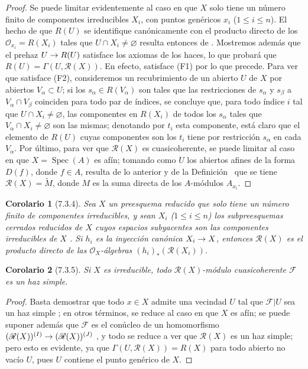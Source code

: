 \documentclass[oneside]{amsart}
\theoremstyle{ega-env-style}
\theoremstyle{ega-thm-env-style}
\newtheorem*{corollary}{Corolario}
\theoremstyle{ega-defn-env-style}
\def\leq{\leqslant}                 %
\renewcommand{\to}{\mathchoice{\longrightarrow}{\rightarrow}{\rightarrow}{\rightarrow}}
\let\EGAOriginalLabel\label
\renewcommand{\label}[1]{\phantomsection\EGAOriginalLabel{#1}}
\begin{document}
\begin{proof}
Se puede limitar evidentemente al caso en que $X$ solo tiene un número finito de componentes irreducibles $X_i$, con puntos genéricos $x_i$ ($1\leq i\leq n$).
El hecho de que $R(U)$ se identifique canónicamente con el producto directo de los $\mathscr{O}_{x_i}=R(X_i)$ tales que $U\cap X_i\neq\varnothing$ resulta entonces de .
Mostremos además que el prehaz $U\to R(U)$ satisface los axiomas de los haces, lo que probará que $R(U)=\Gamma(U,\mathscr{R}(X))$.
En efecto, satisface (F1) por lo que precede.
Para ver que satisface (F2), consideremos un recubrimiento de un abierto $U$ de $X$ por abiertos $V_\alpha\subset U$; si los $s_\alpha\in R(V_\alpha)$ son tales que las restricciones de $s_\alpha$ y $s_\beta$ a $V_\alpha\cap V_\beta$ coinciden para todo par de índices, se concluye que, para todo índice $i$ tal que $U\cap X_i\neq\varnothing$, las componentes en $R(X_i)$ de todos los $s_\alpha$ tales que $V_\alpha\cap X_i\neq\varnothing$ son las mismas; denotando por $t_i$ esta componente, está claro que el elemento de $R(U)$ cuyas componentes son los $t_i$ tiene por restricción $s_\alpha$ en cada $V_\alpha$.
Por último, para ver que $\mathscr{R}(X)$ es cuasicoherente, se puede limitar al caso en que $X=\operatorname{Spec}(A)$ es afín; tomando como $U$ los abiertos afines de la forma $D(f)$, donde $f\in A$, resulta de lo anterior y de la Definición~ que se tiene $\mathscr{R}(X)=\widetilde M$, donde $M$ es la suma directa de los $A$-módulos $A_{x_i}$.
\end{proof}

\begin{corollary}[7.3.4]
\label{I.7.3.4}
Sea $X$ un preesquema reducido que solo tiene un número finito de componentes irreducibles, y sean $X_i$ ($1\leq i\leq n$) los subpreesquemas cerrados reducidos de $X$ cuyos espacios subyacentes son las componentes irreducibles de $X$ .
Si $h_i$ es la inyección canónica $X_i\to X$, entonces $\mathscr{R}(X)$ es el producto directo de las $\mathscr{O}_X$-álgebras $(h_i)_*(\mathscr{R}(X_i))$.
\end{corollary}

\begin{corollary}[7.3.5]
\label{I.7.3.5}
Si $X$ es irreducible, todo $\mathscr{R}(X)$-módulo cuasicoherente $\mathscr{F}$ es un haz simple.
\end{corollary}

\begin{proof}
Basta demostrar que todo $x\in X$ admite una vecindad $U$ tal que $\mathscr{F}|U$ sea un haz simple ; en otros términos, se reduce al caso en que $X$ es afín; se puede suponer además que $\mathscr{F}$ es el conúcleo de un homomorfismo $(\mathscr{R}(X))^{(I)}\to(\mathscr{R}(X))^{(J)}$ , y todo se reduce a ver que $\mathscr{R}(X)$ es un haz simple; pero esto es evidente, ya que $\Gamma(U,\mathscr{R}(X))=R(X)$ para todo abierto no vacío $U$, pues $U$ contiene el punto genérico de $X$.
\end{proof}
\end{document}

